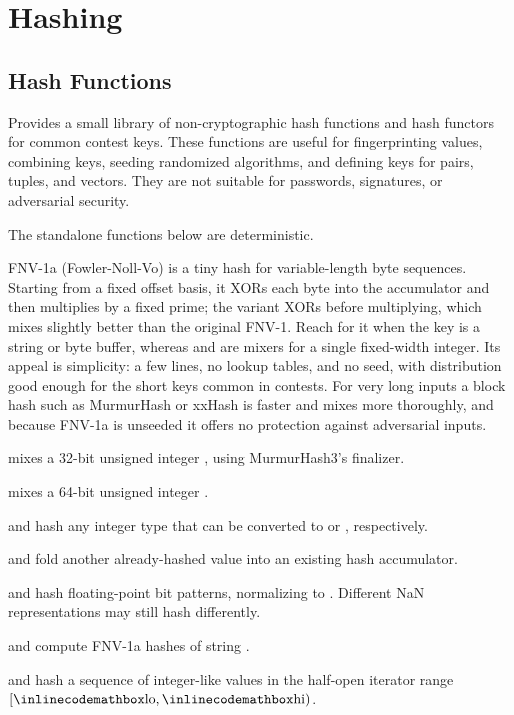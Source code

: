 \section{\texorpdfstring{Hashing}{3.2 Hashing}}
\setcounter{section}{2}
\setcounter{subsection}{0}
\subsection{Hash Functions}
\label{sec:3.2.1}
Provides a small library of non-cryptographic hash functions and hash functors for common contest keys. These functions are useful for fingerprinting values, combining keys, seeding randomized algorithms, and defining  keys for pairs, tuples, and vectors. They are not suitable for passwords, signatures, or adversarial security.

The standalone functions below are deterministic.

FNV-1a (Fowler-Noll-Vo) is a tiny hash for variable-length byte sequences. Starting from a fixed offset basis, it XORs each byte into the accumulator and then multiplies by a fixed prime; the  variant XORs before multiplying, which mixes slightly better than the original FNV-1. Reach for it when the key is a string or byte buffer, whereas  and  are mixers for a single fixed-width integer. Its appeal is simplicity: a few lines, no lookup tables, and no seed, with distribution good enough for the short keys common in contests. For very long inputs a block hash such as MurmurHash or xxHash is faster and mixes more thoroughly, and because FNV-1a is unseeded it offers no protection against adversarial inputs.

\begin{compactitem}
  \item {} mixes a 32-bit unsigned integer , using MurmurHash3's finalizer.
  \item {} mixes a 64-bit unsigned integer .
  \item {} and  hash any integer type that can be converted to  or , respectively.
  \item {} and  fold another already-hashed value into an existing hash accumulator.
  \item {} and  hash floating-point bit patterns, normalizing  to . Different NaN representations may still hash differently.
  \item {} and  compute FNV-1a hashes of string .
  \item {} and  hash a sequence of integer-like values in the half-open iterator range $[{\inlinecodemath{lo}}, {\inlinecodemath{hi}})$.
\end{compactitem}

